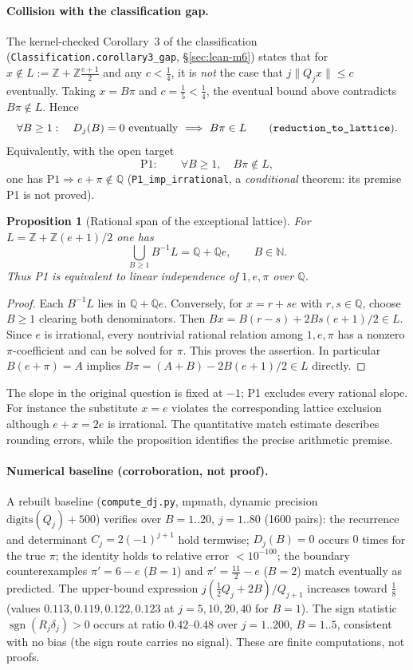 \documentclass[11pt]{amsart}
\newtheorem{proposition}[theorem]{Proposition}
\theoremstyle{definition}
\theoremstyle{remark}
\numberwithin{equation}{section}
\newcommand{\Q}{\mathbb{Q}}
\newcommand{\Z}{\mathbb{Z}}
\newcommand{\N}{\mathbb{N}}
\begin{document}
\paragraph{Collision with the classification gap.} The kernel-checked Corollary~3 of the classification (\texttt{Classification.corollary3\_gap}, \S\ref{sec:lean-m6}) states that for $x\notin L:=\Z+\Z\frac{e+1}{2}$ and any $c<\tfrac14$, it is \emph{not} the case that $j\|Q_jx\|\le c$ eventually. Taking $x=B\pi$ and $c=\tfrac15<\tfrac14$, the eventual bound above contradicts $B\pi\notin L$. Hence
\[
\forall B\ge1:\quad D_j(B)=0\ \text{eventually}\ \Longrightarrow\ B\pi\in L
\qquad\text{(\texttt{reduction\_to\_lattice}).}
\]
Equivalently, with the open target
\[
\mathrm{P1}:\qquad \forall B\ge1,\quad B\pi\notin L,
\]
one has $\mathrm{P1}\Rightarrow e+\pi\notin\Q$ (\texttt{P1\_imp\_irrational}, a \emph{conditional} theorem: its premise P1 is not proved).

\begin{proposition}[Rational span of the exceptional lattice]
\label{prop:rational-span}
For $L=\Z+\Z(e+1)/2$ one has
\[
\bigcup_{B\ge1} B^{-1}L=\Q+\Q e,\qquad B\in\N.
\]
Thus P1 is equivalent to linear independence of $1,e,\pi$ over $\Q$.
\end{proposition}
\begin{proof}
Each $B^{-1}L$ lies in $\Q+\Q e$. Conversely, for $x=r+se$ with
$r,s\in\Q$, choose $B\ge1$ clearing both denominators. Then
$Bx=B(r-s)+2Bs(e+1)/2\in L$. Since $e$ is irrational, every
nontrivial rational relation among $1,e,\pi$ has a nonzero
$\pi$-coefficient and can be solved for $\pi$. This proves the assertion.
In particular $B(e+\pi)=A$ implies
$B\pi=(A+B)-2B(e+1)/2\in L$ directly.
\end{proof}
The slope in the original question is fixed at $-1$; P1 excludes every
rational slope. For instance the substitute $x=e$ violates the
corresponding lattice exclusion although $e+x=2e$ is irrational.
The quantitative match estimate describes rounding errors, while the
proposition identifies the precise arithmetic premise.

\paragraph{Numerical baseline (corroboration, not proof).} A rebuilt baseline (\texttt{compute\_dj.py}, mpmath, dynamic precision $\mathrm{digits}(Q_j)+500$) verifies over $B=1..20$, $j=1..80$ (1600 pairs): the recurrence and determinant $C_j=2(-1)^{j+1}$ hold termwise; $D_j(B)=0$ occurs $0$ times for the true $\pi$; the identity holds to relative error $<10^{-100}$; the boundary counterexamples $\pi'=6-e$ ($B=1$) and $\pi'=\tfrac{11}{2}-e$ ($B=2$) match eventually as predicted. The upper-bound expression $j(\tfrac12Q_j+2B)/Q_{j+1}$ increases toward $\tfrac18$ (values $0.113,0.119,0.122,0.123$ at $j=5,10,20,40$ for $B=1$). The sign statistic $\operatorname{sgn}(R_j\delta_j)>0$ occurs at ratio $0.42$--$0.48$ over $j=1..200$, $B=1..5$, consistent with no bias (the sign route carries no signal). These are finite computations, not proofs.
\end{document}
